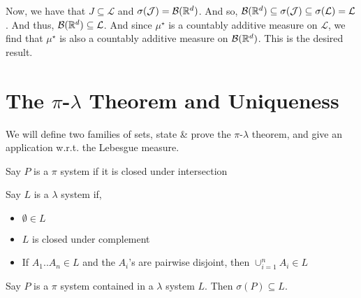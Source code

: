 Now, we have that $J \subseteq \mathcal L$ and $\sigma(\mathcal J) = \mathcal B(\mathbb R^d)$. 
And so, $\mathcal B(\mathbb R^d) \subseteq \sigma(\mathcal J) \subseteq \sigma(\mathcal L) = \mathcal L$. 
And thus, $\mathcal B(\mathbb R^d) \subseteq \mathcal L$. And since $\mu^\star$ is a countably additive measure on 
$\mathcal L$, we find that $\mu^\star$ is also a countably additive measure on 
$\mathcal B(\mathbb R^d)$. This is the desired result.

\section{The $\pi$-$\lambda$ Theorem and Uniqueness}

We will define two families of sets, state \& prove the $\pi$-$\lambda$ theorem, 
and give an application w.r.t. the Lebesgue measure. 

\begin{definition}[$\pi$-System]
   Say $P$ is a $\pi$ system if it is closed under intersection
\end{definition}
\begin{definition} 
   Say $L$ is a $\lambda$ system if, 
   \begin{itemize}
      \item $\emptyset \in L$
      \item $L$ is closed under complement
      \item If $A_1..A_n \in L$ and the $A_i$'s are pairwise disjoint, then $\cup_{i=1}^n A_i \in L$
   \end{itemize}
\end{definition}
\begin{theorem}
   Say $P$ is a $\pi$ system contained in a $\lambda$ system $L$. Then 
   $\sigma(P) \subseteq L$. 
\end{theorem}
